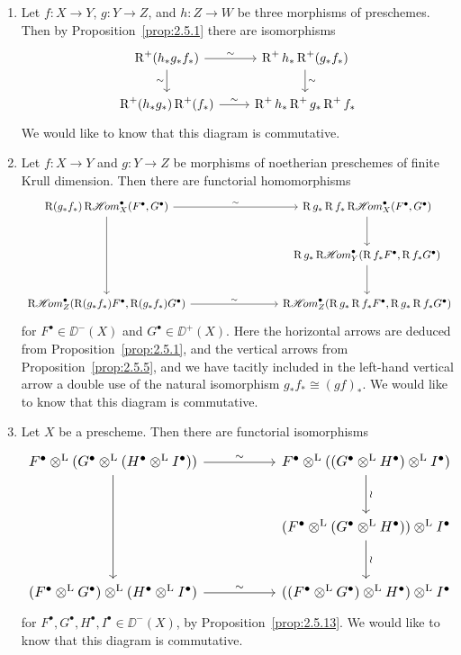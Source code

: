 \begin{enumerate}
\item Let $f\colon X\to Y$, $g\colon Y\to Z$, and $h\colon Z\to W$ be three morphisms of preschemes. Then by Proposition~\ref{prop:2.5.1} there are isomorphisms
\[
\begin{tikzcd}
\RR^+(h_*g_*f_*) \arrow[r, "\sim"] \arrow[d, "\sim"'] & \RR^+h_* \RR^+(g_*f_*) \arrow[d, "\sim"] \\
\RR^+(h_*g_*)\RR^+(f_*) \arrow[r, "\sim"] & \RR^+h_* \RR^+g_* \RR^+f_*
\end{tikzcd}
\]
We would like to know that this diagram is commutative.

\item Let $f\colon X\to Y$ and $g\colon Y\to Z$ be morphisms of noetherian preschemes of finite Krull dimension. Then there are functorial homomorphisms
\[
\resizebox{\linewidth}{!}{\begin{tikzcd}[ampersand replacement=\&, row sep=large, column sep=8em]
	\RR(g_* f_*) \RsheafHom_X^\bullet(F^\bullet, G^\bullet)
	\arrow[r, "\sim"]
	\arrow[dd]
	\& \RR g_* \RR f_* \RsheafHom_X^\bullet(F^\bullet, G^\bullet)
	\arrow[d] \\
	\& \RR g_* \RsheafHom_Y^\bullet(\RR f_* F^\bullet, \RR f_* G^\bullet)
	\arrow[d] \\
	\RsheafHom_Z^\bullet(\RR(g_* f_*) F^\bullet, \RR(g_* f_*) G^\bullet)
	\arrow[r, "\sim"]
	\& \RsheafHom_Z^\bullet(\RR g_* \RR f_* F^\bullet, \RR g_* \RR f_* G^\bullet)
\end{tikzcd}}
\]
for $F^\bullet\in\DD^-(X)$ and $G^\bullet\in\DD^+(X)$. Here the horizontal arrows are deduced from Proposition~\ref{prop:2.5.1}, and the vertical arrows from Proposition~\ref{prop:2.5.5}, and we have tacitly included in the left-hand vertical arrow a double use of the natural isomorphism $g_*f_*\cong(gf)_*$. We would like to know that this diagram is commutative.

\item Let $X$ be a prescheme. Then there are functorial isomorphisms
\[
\resizebox{\linewidth}{!}{\begin{tikzcd}[ampersand replacement=\&, row sep=large, column sep=5em]
	F^\bullet \derivedtensor (G^\bullet \derivedtensor (H^\bullet \derivedtensor I^\bullet))
	\arrow[r, "\sim"]
	\arrow[dd]
	\& F^\bullet \derivedtensor ((G^\bullet \derivedtensor H^\bullet) \derivedtensor I^\bullet)
	\arrow[d, "\wr"] \\
	\& (F^\bullet \derivedtensor (G^\bullet \derivedtensor H^\bullet)) \derivedtensor I^\bullet
	\arrow[d, "\wr"] \\
	(F^\bullet \derivedtensor G^\bullet) \derivedtensor (H^\bullet \derivedtensor I^\bullet)
	\arrow[r, "\sim"]
	\& ((F^\bullet \derivedtensor G^\bullet) \derivedtensor H^\bullet) \derivedtensor I^\bullet
\end{tikzcd}}
\]
for $F^\bullet, G^\bullet, H^\bullet, I^\bullet\in\DD^-(X)$, by Proposition~\ref{prop:2.5.13}. We would like to know that this diagram is commutative.
\end{enumerate}

